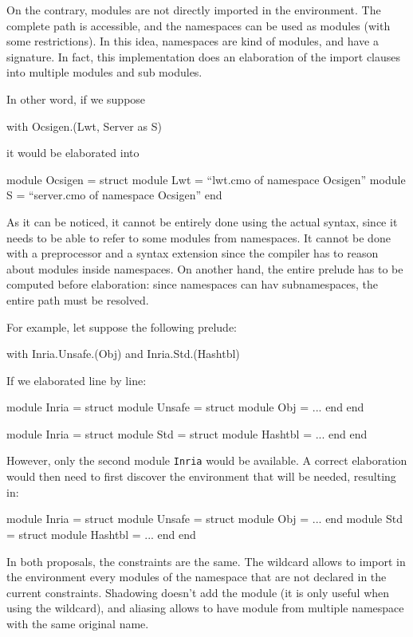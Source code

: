 \documentclass[11pt,a4paper]{article}
\begin{document}
On the contrary, modules are not directly imported in the environment. The
complete path is accessible, and the namespaces can be used as modules (with
some restrictions). In this idea, namespaces are kind of modules, and have a
signature. In fact, this implementation does an elaboration of the import
clauses into multiple modules and sub modules.

In other word, if we suppose
\begin{OCaml}
with Ocsigen.(Lwt, Server as S)
\end{OCaml}
it would be elaborated into
\begin{OCaml}
module Ocsigen = struct
  module Lwt = ``lwt.cmo of namespace Ocsigen''
  module S = ``server.cmo of namespace Ocsigen''
end
\end{OCaml}

As it can be noticed, it cannot be entirely done using the actual syntax, since
it needs to be able to refer to some modules from namespaces. It cannot be done
with a preprocessor and a syntax extension since the compiler has to reason
about modules inside namespaces. On another hand, the entire prelude has to be
computed before elaboration: since namespaces can hav subnamespaces, the entire
path must be resolved.

For example, let suppose the following prelude:
\begin{OCaml}
with Inria.Unsafe.(Obj)
and Inria.Std.(Hashtbl)
\end{OCaml}
If we elaborated line by line:
\begin{OCaml}
module Inria = struct
  module Unsafe = struct
    module Obj = ...
  end
end

module Inria = struct
  module Std = struct
    module Hashtbl = ...
  end
end

\end{OCaml}
However, only the second module \texttt{Inria} would be available. A correct
elaboration would then need to first discover the environment that will be
needed, resulting in:
\begin{OCaml}
module Inria = struct
  module Unsafe = struct
    module Obj = ...
  end
  module Std = struct
    module Hashtbl = ...
  end
end
\end{OCaml}


\medskip

In both proposals, the constraints are the same. The wildcard allows to import
in the environment every modules of the namespace that are not declared in the
current constraints. Shadowing doesn't add the module (it is only useful when
using the wildcard), and aliasing allows to have module from multiple namespace
with the same original name.
\end{document}
